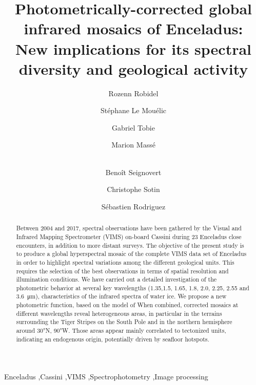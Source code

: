\documentclass{arxiv-icarus}
\begin{document}
\begin{frontmatter}
\title{Photometrically-corrected global infrared mosaics of Enceladus:\\New implications for its spectral diversity and geological activity}

\author[LPG]{Rozenn Robidel}
\author[LPG]{St\'{e}phane Le Mou\'{e}lic}
\author[LPG]{Gabriel Tobie}
\author[LPG]{Marion Mass\'{e}}
\author[JPL]{\\Beno\^{i}t Seignovert}
\author[JPL]{Christophe Sotin}
\author[IPG]{S\'{e}bastien Rodriguez}

\address[LPG]{Laboratoire de Plan\'{e}tologie et G\'{e}odynamique, UMR 6112, CNRS, Universit\'{e} de Nantes, Nantes, France}
\address[JPL]{Jet Propulsion Laboratory, California Institute of Technology, Pasadena CA, USA}
\address[IPG]{Universit\'{e} de Paris, Institut de Physique du Globe de Paris, CNRS, Paris, France}

\begin{abstract}
Between 2004 and 2017, spectral observations have been gathered by the Visual and Infrared Mapping Spectrometer (VIMS) on-board Cassini \citep{Brown2004} during 23 Enceladus close encounters, in addition to more distant surveys. The objective of the present study is to produce a global hyperspectral mosaic of the complete VIMS data set of Enceladus in order to highlight spectral variations among the different geological units. This requires the selection of the best observations in terms of spatial resolution and illumination conditions. We have carried out a detailed investigation of the photometric behavior at several key wavelengths (\num{1.35},\num{1.5}, \num{1.65}, \num{1.8}, \num{2.0}, \num{2.25}, \num{2.55} and \SI{3.6}{\um}), characteristics of the infrared spectra of water ice. We propose a new photometric function, based on the model of \cite{Shkuratov2011} When combined, corrected mosaics at different wavelengths reveal heterogeneous areas, in particular in the terrains surrounding the Tiger Stripes on the South Pole and in the northern hemisphere around \ang{30}N, \ang{90}W. Those areas appear mainly correlated to tectonized units, indicating an endogenous origin, potentially driven by seafloor hotspots.
\end{abstract}

\begin{keyword}
Enceladus \sep Cassini \sep VIMS \sep Spectrophotometry \sep Image processing
\end{keyword}

\end{frontmatter}
\end{document}
